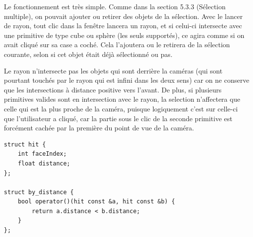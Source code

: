 Le fonctionnement est très simple. Comme dans la section 5.3.3 (Sélection multiple), on pouvait ajouter ou retirer des objets de la sélection. Avec le lancer de rayon, tout clic dans la fenêtre lancera un rayon, et si celui-ci intersecte avec une primitive de type cube ou sphère (les seuls supportés), ce agira comme si on avait cliqué sur sa case a coché. Cela l'ajoutera ou le retirera de la sélection courante, selon si cet objet était déjà sélectionné ou pas.

Le rayon n'intersecte pas les objets qui sont derrière la caméras (qui sont pourtant touchés par le rayon qui est infini dans les deux sens) car on ne conserve que les intersections à distance positive vers l'avant. De plus, si plusieurs primitives valides sont en intersection avec le rayon, la selection n'affectera que celle qui est la plus proche de la caméra, puisque logiquement c'est sur celle-ci que l'utilisateur a cliqué, car la partie sous le clic de la seconde primitive est forcément cachée par la première du point de vue de la caméra.

\begin{lstlisting}
struct hit {
	int faceIndex;
	float distance;
};

struct by_distance {
	bool operator()(hit const &a, hit const &b) {
		return a.distance < b.distance;
	}
};
\end{lstlisting}


